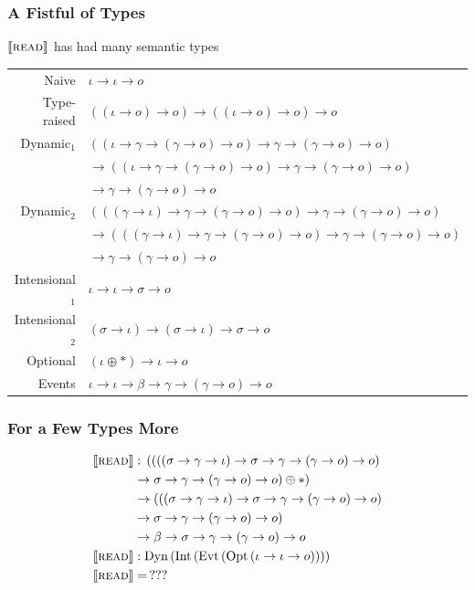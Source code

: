 \documentclass{beamer}
\begin{document}
\begin{frame}
  \frametitle{A Fistful of Types}

  $\llbracket \textsc{read} \rrbracket$ has had many semantic types

  \vfill

  \begin{tabular}{rl}
    Naive & $\iota \to \iota \to o$ \\
    Type-raised & $((\iota \to o) \to o) \to ((\iota \to o) \to o) \to o$ \\
    Dynamic$_1$ & $((\iota \to \gamma \to (\gamma \to o) \to o) \to \gamma \to (\gamma \to o) \to o)$ \\ & $\to ((\iota \to \gamma \to (\gamma \to o) \to o) \to \gamma \to (\gamma \to o) \to o)$ \\ & $\to \gamma \to (\gamma \to o) \to o$ \\
    Dynamic$_2$ & $(((\gamma \to \iota) \to \gamma \to (\gamma \to o) \to o) \to \gamma \to (\gamma \to o) \to o)$ \\ & $\to (((\gamma \to \iota) \to \gamma \to (\gamma \to o) \to o) \to \gamma \to (\gamma \to o) \to o)$ \\ & $\to \gamma \to (\gamma \to o) \to o$ \\
    Intensional$_1$ & $\iota \to \iota \to \sigma \to o$ \\
    Intensional$_2$ & $(\sigma \to \iota) \to (\sigma \to \iota) \to \sigma \to o$ \\
    Optional & $(\iota \oplus *) \to \iota \to o$ \\
    Events & $\iota \to \iota \to \beta \to \gamma \to (\gamma \to o) \to o$
  \end{tabular}
\end{frame}


\begin{frame}
  \frametitle{For a Few Types More}
  
  \begin{align*}
    \llbracket \textsc{read} \rrbracket &: \, ((((\sigma \to \gamma \to \iota) \to \sigma \to \gamma \to (\gamma \to o) \to o) \\
    & \to \sigma \to \gamma \to (\gamma \to o) \to o) \oplus *) \\
    & \to (((\sigma \to \gamma \to \iota) \to \sigma \to \gamma \to (\gamma \to o) \to o) \\
    & \to \sigma \to \gamma \to (\gamma \to o) \to o) \\
    & \to \beta \to \sigma \to \gamma \to (\gamma \to o) \to o \\
    \llbracket \textsc{read} \rrbracket &: \operatorname{Dyn}\,(\operatorname{Int}\,(\operatorname{Evt}\,(\operatorname{Opt}\,(\iota \to \iota \to o)))) \\
    \llbracket \textsc{read} \rrbracket & =\, ???
  \end{align*}
\end{frame}
\end{document}
